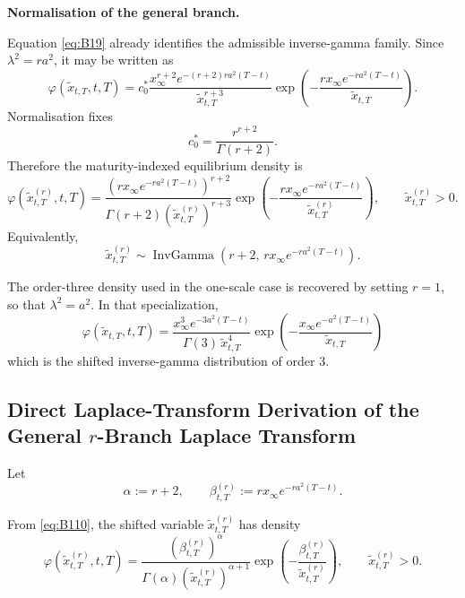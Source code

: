 \documentclass[12pt]{article}
\theoremstyle{statementstyle}
\begin{document}
\begin{appendices}
\medskip
\noindent\textbf{Normalisation of the general branch.}

Equation \eqref{eq:B19} already identifies the admissible inverse-gamma family. Since
\(\lambda^{2}=ra^{2}\), it may be written as
\[
\varphi(\widetilde{x}_{t,T},t,T)
=
c_0^{*}
\frac{x_{\infty}^{r+2}e^{-(r+2)ra^{2}(T-t)}}{\widetilde{x}_{t,T}^{r+3}}
\exp\!\left(-\frac{r x_{\infty}e^{-ra^{2}(T-t)}}{\widetilde{x}_{t,T}}\right).
\]
Normalisation fixes
\[
c_0^{*}=\frac{r^{r+2}}{\Gamma(r+2)}.
\]
Therefore the maturity-indexed equilibrium density is
\begin{equation}
\boxed{
\varphi(\widetilde{x}^{(r)}_{t,T},t,T)
=
\frac{\left(r x_{\infty}e^{-ra^{2}(T-t)}\right)^{r+2}}
{\Gamma(r+2)\left(\widetilde{x}^{(r)}_{t,T}\right)^{r+3}}
\exp\!\left(
-\frac{r x_{\infty}e^{-ra^{2}(T-t)}}{\widetilde{x}^{(r)}_{t,T}}
\right),
\qquad \widetilde{x}^{(r)}_{t,T}>0.
}
\tag{B.1.10}\label{eq:B110}
\end{equation}
Equivalently,
\[
\widetilde{x}^{(r)}_{t,T}
\sim
\operatorname{InvGamma}\!\left(r+2,\,r x_{\infty}e^{-ra^{2}(T-t)}\right).
\]

The order-three density used in the one-scale case is recovered by setting \(r=1\), so that
\(\lambda^{2}=a^{2}\). In that specialization,
\begin{equation}
\boxed{
\varphi(\widetilde{x}_{t,T},t,T)
=
\frac{x_{\infty}^{3}e^{-3a^{2}(T-t)}}{\Gamma(3)\,\widetilde{x}_{t,T}^{4}}
\exp\!\left(
-\frac{x_{\infty}e^{-a^{2}(T-t)}}{\widetilde{x}_{t,T}}
\right)
}
\tag{B.1.12}\label{eq:B112}
\end{equation}
which is the shifted inverse-gamma distribution of order \(3\).

\subsection{Direct Laplace-Transform Derivation of the General \(r\)-Branch Laplace Transform}
\label{appendix:B2}

Let
\[
\alpha := r+2,
\qquad
\beta_{t,T}^{(r)} := r x_{\infty}e^{-ra^{2}(T-t)}.
\]

From \eqref{eq:B110}, the shifted variable \(\widetilde{x}^{(r)}_{t,T}\) has density
\[
\varphi(\widetilde{x}^{(r)}_{t,T},t,T)
=
\frac{\left(\beta_{t,T}^{(r)}\right)^{\alpha}}
{\Gamma(\alpha)\left(\widetilde{x}^{(r)}_{t,T}\right)^{\alpha+1}}
\exp\!\left(
-\frac{\beta_{t,T}^{(r)}}{\widetilde{x}^{(r)}_{t,T}}
\right),
\qquad
\widetilde{x}^{(r)}_{t,T}>0.
\]


\end{appendices}
\end{document}
